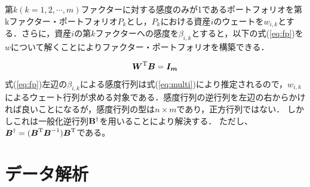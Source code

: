 ﻿\documentclass[11pt]{jreport}
\begin{document}
第$k(k=1,2,\cdots,m)$ファクターに対する感度のみが1であるポートフォリオを第kファクター・ポートフォリオ$P_k$とし，$P_k$における資産$i$のウェートを$w_{i,k}$とする．さらに，資産$i$の第$k$ファクターへの感度を$\beta_{i,k}$とすると，以下の式(\ref{eq:fp})を\mbox{\boldmath $w$}について解くことによりファクター・ポートフォリオを構築できる．



\begin{equation}
\mbox{\boldmath $W$}^\text{T} \mbox{\boldmath $B$} = \mbox{\boldmath $I_m$}
\label{eq:fp}
\end{equation}
式(\ref{eq:fp})左辺の$\beta_{i,k}$による感度行列は式(\ref{eq:multi})により推定されるので，$w_{i,k}$によるウェート行列が求める対象である．感度行列の逆行列を左辺の右からかければ良いことになるが，感度行列の型は$n\times m$であり，正方行列ではない．
しかしこれは一般化逆行列$\bf{B}^\dag$を用いることにより解決する．
ただし、$\mbox{\boldmath $B$}^\dag = (\mbox{\boldmath $B$}^\text{T}\mbox{\boldmath $B$}^{-1})\mbox{\boldmath $B$}^\text{T}$である。







\chapter{データ解析}
\end{document}
